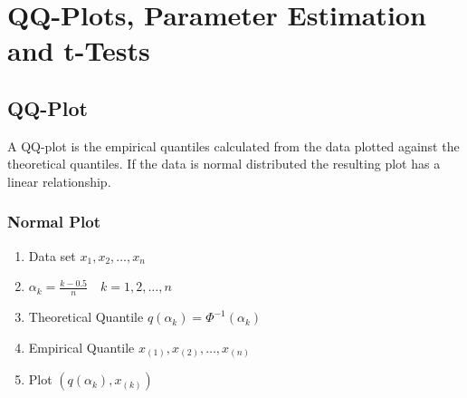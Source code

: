 \documentclass[11pt]{article}
\theoremstyle{definition}
\begin{document}


\section{QQ-Plots, Parameter Estimation and t-Tests}

\subsection{QQ-Plot}

A QQ-plot is the empirical quantiles calculated from the data plotted against the theoretical quantiles. If the data is normal distributed the resulting plot has a linear relationship.

\subsubsection{Normal Plot}
\begin{enumerate}[label=(\arabic*)]
	\item Data set $x_1,x_2,\dots, x_n$
	\item $\alpha_k = \frac{k-0.5}{n}\quad k=1,2,\dots,n$
	\item Theoretical Quantile $q(\alpha_k) = \Phi^{-1}(\alpha_k)$
	\item Empirical Quantile $x_{(1)}, x_{(2)},\dots, x_{(n)}$
	\item Plot $\left( q(\alpha_k), x_{(k)} \right)$
\end{enumerate}
\end{document}
